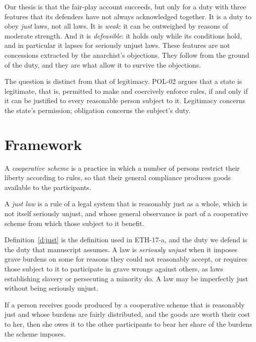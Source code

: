 \documentclass{situationist-preprint}
\begin{document}
Our thesis is that the fair-play account succeeds, but only for a duty with three features that its defenders have not always acknowledged together. It is a duty to obey \emph{just} laws, not all laws. It is \emph{weak}: it can be outweighed by reasons of moderate strength. And it is \emph{defeasible}: it holds only while its conditions hold, and in particular it lapses for seriously unjust laws. These features are not concessions extracted by the anarchist's objections. They follow from the ground of the duty, and they are what allow it to survive the objections.

The question is distinct from that of legitimacy. POL-02 argues that a state is legitimate, that is, permitted to make and coercively enforce rules, if and only if it can be justified to every reasonable person subject to it. Legitimacy concerns the state's permission; obligation concerns the subject's duty.

\section{Framework}

\begin{definition}\label{d:scheme}
A \emph{cooperative scheme} is a practice in which a number of persons restrict their liberty according to rules, so that their general compliance produces goods available to the participants.
\end{definition}

\begin{definition}\label{d:just}
A \emph{just law} is a rule of a legal system that is reasonably just as a whole, which is not itself seriously unjust, and whose general observance is part of a cooperative scheme from which those subject to it benefit.
\end{definition}

Definition~\ref{d:just} is the definition used in ETH-17-a, and the duty we defend is the duty that manuscript assumes. A law is \emph{seriously unjust} when it imposes grave burdens on some for reasons they could not reasonably accept, or requires those subject to it to participate in grave wrongs against others, as laws establishing slavery or persecuting a minority do. A law may be imperfectly just without being seriously unjust.

\begin{principle}[Fairness]\label{p:fair}
If a person receives goods produced by a cooperative scheme that is reasonably just and whose burdens are fairly distributed, and the goods are worth their cost to her, then she owes it to the other participants to bear her share of the burdens the scheme imposes.
\end{principle}
\end{document}
